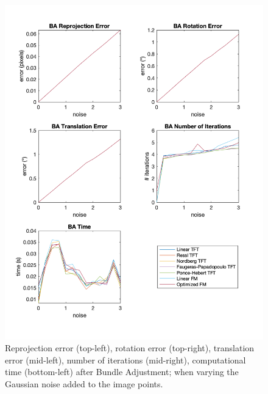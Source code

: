\begin{figure}[p]
	\centering
	\includegraphics[width=1\textwidth]{Experiments/Synthetic/noise/BAnoisePlots.png}
	\caption{Reprojection error (top-left), rotation error (top-right), translation error (mid-left), number of iterations (mid-right), computational time (bottom-left) after Bundle Adjustment; when varying the Gaussian noise added to the image points.}
\end{figure}

